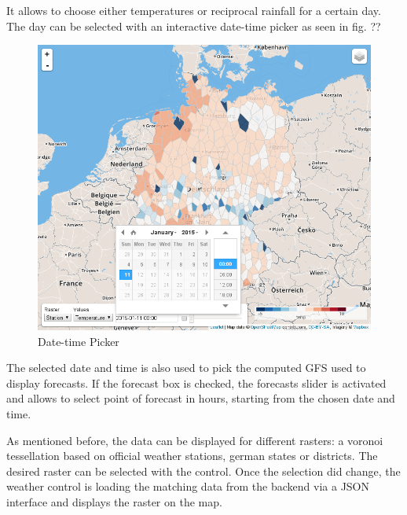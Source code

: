 \documentclass[paper=a4, fontsize=11pt]{scrartcl} %
\numberwithin{equation}{section} %
\numberwithin{figure}{section} %
\numberwithin{table}{section} %
\begin{document}
It allows to choose either temperatures or reciprocal rainfall for a
certain day. The day can be selected with an interactive date-time picker
as seen in fig. ??

\begin{figure}[htbp]
\centering
\includegraphics[width=1\textwidth]{pictures/screenshot-control-datetime.png}
\caption{Date-time Picker}
\end{figure}

The selected date and time is also used to pick the computed GFS used to
display forecasts. If the forecast box is checked, the forecasts slider
is activated and allows to select point of forecast in hours, starting
from the chosen date and time.

As mentioned before, the data can be displayed for different rasters: a
voronoi tessellation based on official weather stations, german states or
districts. The desired raster can be selected with the control. Once the
selection did change, the weather control is loading the matching data
from the backend via a JSON interface and displays the raster on the
map.
\end{document}
